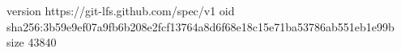 version https://git-lfs.github.com/spec/v1
oid sha256:3b59e9ef07a9fb6b208e2fcf13764a8d6f68e18c15e71ba53786ab551eb1e99b
size 43840

